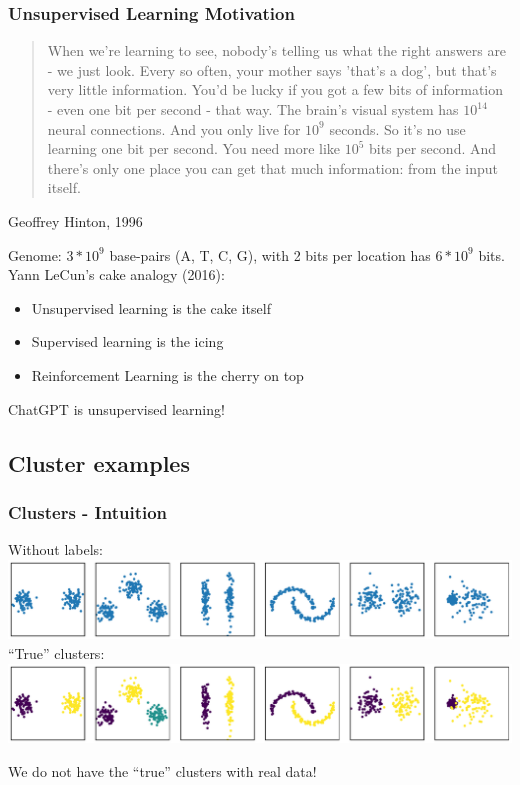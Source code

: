\documentclass[Nike]{tuberlinbeamer}
\begin{document}
\begin{frame}
 \frametitle{Unsupervised Learning Motivation}
  \begin{center}
    \begin{quote}
      When we’re learning to see, nobody's telling us what the right
      answers are - we just look. Every so often, your mother says
      ’that's a dog’, but that's very little information. You'd be lucky if
      you got a few bits of information - even one bit per second - that
      way. The brain's visual system has $10^{14}$ neural connections. And
      you only live for $10^9$ seconds. So it's no use learning one bit per
      second. You need more like $10^5$ bits per second. And there's only
      one place you can get that much information: from the input
      itself.
    \end{quote}
  Geoffrey Hinton, 1996
  \end{center}
  Genome: $3 * 10^9$ base-pairs (A, T, C, G), with 2 bits per location has  $6 * 10^9$ bits. \\

  \pause
  Yann LeCun's cake analogy (2016):
  \begin{itemize}
    \item Unsupervised learning is the cake itself
    \item Supervised learning is the icing
    \item Reinforcement Learning is the cherry on top
  \end{itemize}

  \pause
  ChatGPT is unsupervised learning!
\end{frame}


\subsection{Cluster examples}
\begin{frame}
 \frametitle{Clusters - Intuition}
  \begin{center}
    Without labels:
    \centering\includegraphics[width=1.0\textwidth]{sample_clusters.pdf}
    \pause
    ``True'' clusters:
    \centering\includegraphics[width=1.0\textwidth]{sample_clusters_true_assignment.pdf}
  \end{center}
  We do not have the ``true'' clusters with real data!
\end{frame}
\end{document}
